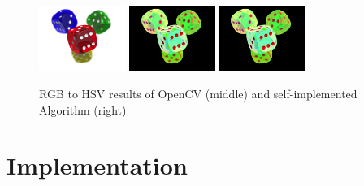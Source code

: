 \begin{figure}[H]
    \centering

    \includegraphics[width=0.25\textwidth]{images/dice.png}
    \includegraphics[width=0.25\textwidth]{images/cv-hsv.png}
    \includegraphics[width=0.25\textwidth]{images/own-hsv.png}
    
    \caption{RGB to HSV results of OpenCV (middle) and self-implemented  Algorithm (right)}
    \label{fig:hsv}
\end{figure}

\section{Implementation}

